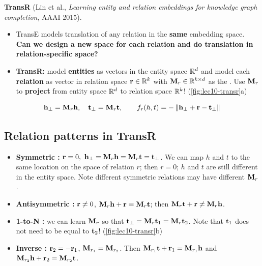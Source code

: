 \textbf{TransR} (Lin et al., \emph{Learning entity and relation embeddings for
knowledge graph completion}, AAAI 2015).
\begin{itemize}
  \item TransE models translation of any relation in the \textbf{same} embedding
    space. \textbf{Can we design a new space for each relation and do
    translation in relation-specific space?}
  \item \textbf{TransR:} model \textbf{entities} as vectors in the entity space
    $\mathbb{R}^d$ and model each \textbf{relation} as vector in relation space
    $\mathbf{r}\in\mathbb{R}^k$ with $\mathbf{M}_r\in\mathbb{R}^{k\times d}$ as the .
    Use $\mathbf{M}_r$ to \textbf{project} from entity space $\mathbb{R}^d$ to relation space
    $\mathbb{R}^k$! (\cref{fig:lec10-transr}a)
\end{itemize}
\begin{equation}\label{eq:lec10-transr}
  \mathbf{h}_\perp=\mathbf{M}_r\mathbf{h},\quad \mathbf{t}_\perp=\mathbf{M}_r\mathbf{t},\qquad
  f_r(h,t) = -\left\lVert \mathbf{h}_\perp+\mathbf{r}-\mathbf{t}_\perp \right\rVert
\end{equation}

\subsection{Relation patterns in TransR}\label{sec:lec10-transr-patterns}

\begin{itemize}
  \item \textbf{Symmetric \cmark:}
    $\vr=0,\ \vh_\perp=\mM_r\vh=\mM_r\vt=\vt_\perp$. We can map $h$ and $t$ to the
    same location on the space of relation $r$; then $r=0$; $h$ and $t$ are still
    different in the entity space. Note different symmetric relations may have
    different $\mathbf{M}_r$.
  \item \textbf{Antisymmetric \cmark:} $\mathbf{r}\neq0$, $\mathbf{M}_r\mathbf{h}+\mathbf{r}=\mathbf{M}_r\mathbf{t}$; then
    $\mathbf{M}_r\mathbf{t}+\mathbf{r}\neq\mathbf{M}_r\mathbf{h}$.
  \item \textbf{1-to-N \cmark:} we can learn $\mathbf{M}_r$ so that
    $\mathbf{t}_\perp=\mathbf{M}_r\mathbf{t}_1=\mathbf{M}_r\mathbf{t}_2$. Note that $\mathbf{t}_1$ does not need to be equal
    to $\mathbf{t}_2$! (\cref{fig:lec10-transr}b)
  \item \textbf{Inverse \cmark:} $\mathbf{r}_2=-\mathbf{r}_1$, $\mathbf{M}_{r_1}=\mathbf{M}_{r_2}$. Then
    $\mathbf{M}_{r_1}\mathbf{t}+\mathbf{r}_1=\mathbf{M}_{r_1}\mathbf{h}$ and $\mathbf{M}_{r_2}\mathbf{h}+\mathbf{r}_2=\mathbf{M}_{r_2}\mathbf{t}$.
\end{itemize}

